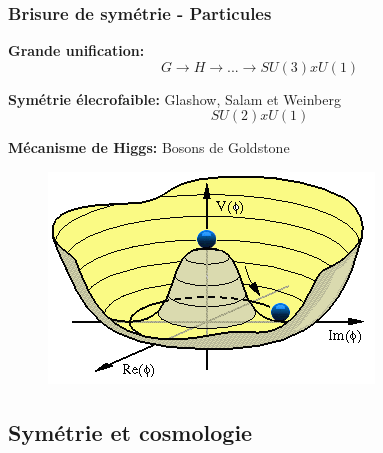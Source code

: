 \documentclass[handout]{beamer}
\begin{document}
\begin{frame}\frametitle{Brisure de symétrie - Particules}

 \textbf{Grande unification:}
\begin{equation*}
G \rightarrow H \rightarrow ... \rightarrow SU(3) x U(1)
\end{equation*}

\textbf{Symétrie élecrofaible:}  Glashow, Salam et Weinberg
  \begin{equation*}
   SU(2)xU(1)
  \end{equation*}

\textbf{Mécanisme de Higgs:} Bosons de Goldstone \\
\begin{figure}[0.3\textwidth]
    \includegraphics[scale=0.4]{higgs.png}
    \end{figure}


  

\end{frame}



\subsection{Symétrie et cosmologie}
%
  
\end{document}
